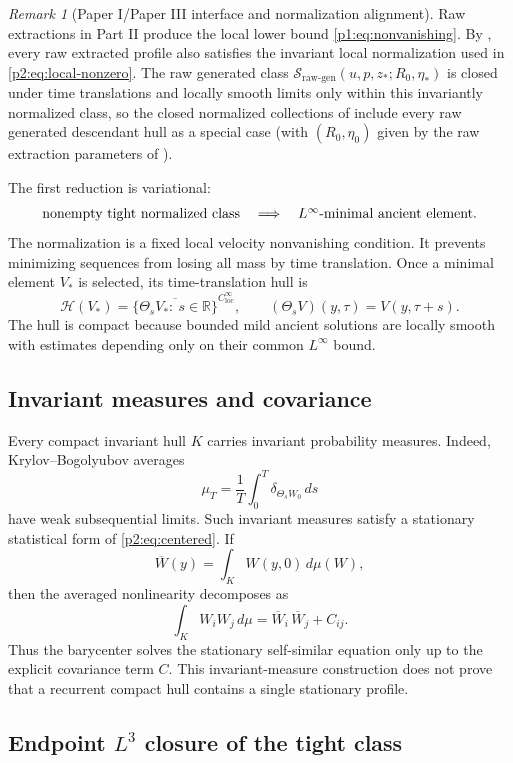 \documentclass[11pt]{amsart}
\theoremstyle{plain}
\theoremstyle{definition}
\theoremstyle{remark}
\newtheorem{remark}[remark]{Remark}
\numberwithin{equation}{section}
\newcommand{\R}{\mathbb R}
\newcommand{\loc}{\mathrm{loc}}
\newcommand{\calS}{\mathcal S}
\newcommand{\calH}{\mathcal H}
\begin{document}
\begin{remark}[Paper I/Paper III interface and normalization alignment]
\label{p2:rem:paper-I-III-interface}
Raw extractions in Part II produce the local lower bound
\eqref{p1:eq:nonvanishing}.  By
, every raw extracted profile
also satisfies the invariant local normalization used in
\eqref{p2:eq:local-nonzero}.  The raw generated class
\(\calS_{\mathrm{raw\text{-}gen}}(u,p,z_*;R_0,\eta_*)\) is closed under time translations and
locally smooth limits only within this invariantly normalized class, so
the closed normalized collections of 
include every raw generated descendant hull as a special case (with
\((R_0,\eta_0)\) given by the raw extraction parameters of
).
\end{remark}

The first reduction is variational:
\[
   \hbox{nonempty tight normalized class}
   \quad\Longrightarrow\quad
   \hbox{\(L^\infty\)-minimal ancient element}.
\]
The normalization is a fixed local velocity nonvanishing condition.  It
prevents minimizing sequences from losing all mass by time translation.
Once a minimal element \(V_*\) is selected, its time-translation hull is
\[
   \calH(V_*)
   =
   \overline{\{\Theta_sV_*:\ s\in\R\}}^{C^\infty_{\loc}},
   \qquad
   (\Theta_sV)(y,\tau)=V(y,\tau+s).
\]
The hull is compact because bounded mild ancient solutions are locally smooth
with estimates depending only on their common \(L^\infty\) bound.

\subsection{Invariant measures and covariance}

Every compact invariant hull \(K\) carries invariant probability measures.
Indeed, Krylov--Bogolyubov averages
\[
   \mu_T=\frac1T\int_0^T\delta_{\Theta_sW_0}\,ds
\]
have weak subsequential limits.  Such invariant measures satisfy a stationary
statistical form of \eqref{p2:eq:centered}.  If
\[
   \overline W(y)=\int_K W(y,0)\,d\mu(W),
\]
then the averaged nonlinearity decomposes as
\[
   \int_K W_iW_j\,d\mu
   =
   \overline W_i\,\overline W_j+C_{ij}.
\]
Thus the barycenter solves the stationary self-similar equation only up to the
explicit covariance term \(C\).  This invariant-measure construction does
not prove that a recurrent compact hull contains a single stationary profile.

\subsection{\texorpdfstring{Endpoint \(L^3\) closure of the tight class}{Endpoint L3 closure of the tight class}}
\end{document}
